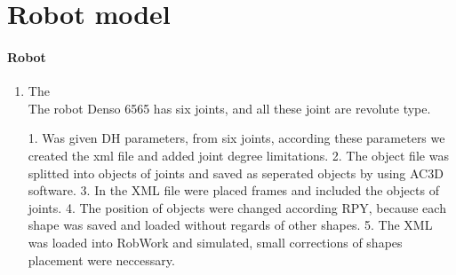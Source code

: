 \section{Robot model}
\label{sec:program}

\paragraph{Robot}

\begin{enumerate}
	\item The \\
	
	The robot Denso 6565 has six joints, and all these joint are revolute type. 

1. Was given DH parameters, from six joints, according these parameters we created the xml file and added joint degree limitations.
2. The object file was splitted into objects of joints and saved as seperated objects by using AC3D software.
3. In the XML file were placed frames and included the objects of joints.
4. The position of objects were changed according RPY, because each shape was saved and loaded without regards of other shapes.
5. The XML was loaded into RobWork and simulated, small corrections of shapes placement were neccessary.
\end{enumerate}
